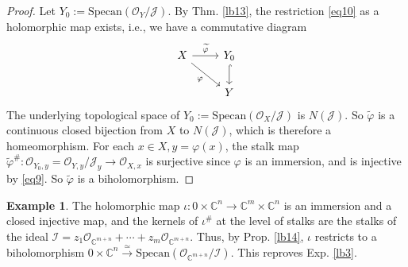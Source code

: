 \documentclass[12pt,b5paper,notitlepage]{report}
\theoremstyle{definition}
\newtheorem{eg}[df]{Example}
\theoremstyle{plain}
\newcommand{\mc}{\mathcal}
\newcommand{\wtd}{\widetilde}
\newcommand{\scr}{\mathscr}
\newcommand{\Cbb}{\mathbb C}
\newcommand{\Specan}{\mathrm{Specan}}
\numberwithin{equation}{section}
\begin{document}
\begin{proof}
Let $Y_0:=\Specan(\scr O_Y/\mc J)$. By Thm. \ref{lb13}, the restriction \eqref{eq10} as a holomorphic map exists, i.e., we have a commutative diagram
\begin{equation*}
\begin{tikzcd}
X \arrow[r, "\wtd\varphi"] \arrow[rd, "\varphi"'] & Y_0 \arrow[d, hook] \\
                                  & Y                
\end{tikzcd}
\end{equation*}
The underlying topological space of $Y_0:=\Specan(\scr O_X/\mc J)$ is $N(\mc J)$. So $\wtd\varphi$ is a continuous closed bijection from $X$ to $N(\mc J)$, which is therefore a homeomorphism. For each $x\in X,y=\varphi(x)$, the stalk map $\wtd\varphi^\#:\scr O_{Y_0,y}=\scr O_{Y,y}/\mc J_y\rightarrow\scr O_{X,x}$ is surjective since $\varphi$ is an immersion, and is injective by \eqref{eq9}. So $\wtd\varphi$ is a biholomorphism.
\end{proof}



\begin{eg}\label{lb22}
The holomorphic map $\iota:0\times\Cbb^n\rightarrow\Cbb^m\times\Cbb^n$ is an immersion and a closed injective map, and the kernels of $\iota^\#$ at the level  of stalks are the stalks of the ideal $\mc I=z_1\scr O_{\Cbb^{m+n}}+\cdots+ z_m\scr O_{\Cbb^{m+n}}$. Thus, by Prop. \ref{lb14}, $\iota$ restricts to a biholomorphism $0\times\Cbb^n\xrightarrow{\simeq}\Specan(\scr O_{\Cbb^{m+n}}/\mc I)$. This reproves Exp. \ref{lb3}.
\end{eg}
\end{document}
